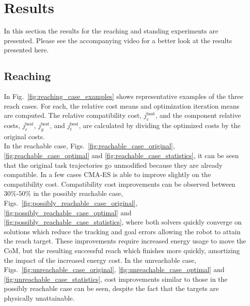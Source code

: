 \documentclass[12pt,a4paper,twoside]{article}
\begin{document}
\section{Results}
\label{sec:results}

In this section the results for the reaching and standing experiments are presented. Please see the accompanying video for a better look at the results presented here.

\subsection{Reaching}
\label{sec:results_reaching}

    In Fig.~\ref{fig:reaching_case_examples} shows representative examples of the three reach cases. For each, the relative cost means and optimization iteration means are computed. The relative compatibility cost, $j_{c}^{\text{best}}$, and the component relative costs, $j_{e}^{\text{best}}$, $j_{g}^{\text{best}}$, and $j_{t}^{\text{best}}$, are calculated by dividing the optimized costs by the original costs.\\

    In the reachable case, Figs.~\ref{fig:reachable_case_original}, \ref{fig:reachable_case_optimal} and \ref{fig:reachable_case_statistics}, it can be seen that the original task trajectories go unmodified because they are already compatible. In a few cases CMA-ES is able to improve slightly on the compatibility cost.
   Compatibility cost improvements can be observed between $30\%$-$50\%$ in the possibly reachable case, Figs.~\ref{fig:possibly_reachable_case_original}, \ref{fig:possibly_reachable_case_optimal} and \ref{fig:possibly_reachable_case_statistics}, where both solvers quickly converge on solutions which reduce the tracking and goal errors allowing the robot to attain the reach target. These improvements require increased energy usage to move the CoM, but the resulting successful reach which finishes more quickly, amortizing the impact of the increased energy cost.
    In the unreachable case, Figs.~\ref{fig:unreachable_case_original}, \ref{fig:unreachable_case_optimal} and \ref{fig:unreachable_case_statistics}, cost improvements similar to those in the possibly reachable case can be seen, despite the fact that the targets are physically unattainable.\\
\end{document}
